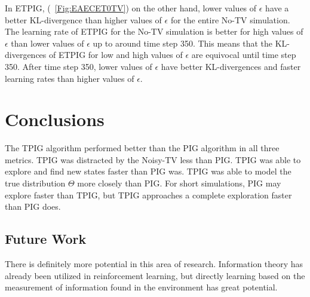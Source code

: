 \documentclass[12pt]{thesis}
\begin{document}
In ETPIG, (\figurename~\ref{Fig:EAECET0TV}) on the other hand, lower values of $\epsilon$ have a better KL-divergence than higher values of $\epsilon$ for the entire No-TV simulation. The learning rate of ETPIG for the No-TV simulation is better for high values of $\epsilon$ than lower values of $\epsilon$ up to around time step 350. This means that the KL-divergences of ETPIG for low and high values of $\epsilon$ are equivocal until time step 350. After time step 350, lower values of $\epsilon$ have better KL-divergences and faster learning rates than higher values of $\epsilon$.




\chapter{Conclusions}
The TPIG algorithm performed better than the PIG algorithm in all three metrics. TPIG was distracted by the Noisy-TV less than PIG. TPIG was able to explore and find new states faster than PIG was. TPIG was able to model the true distribution $\Theta$ more closely than PIG. For short simulations, PIG may explore faster than TPIG, but TPIG approaches a complete exploration faster than PIG does.
\section{Future Work}
There is definitely more potential in this area of research. Information theory has already been utilized in reinforcement learning, but directly learning based on the measurement of information found in the environment has great potential. 
\end{document}

